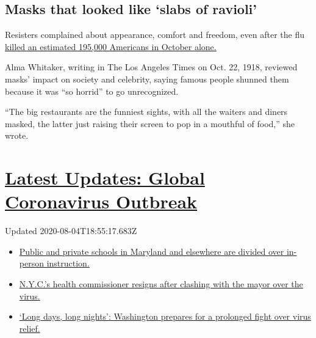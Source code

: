 \hypertarget{masks-that-looked-like-slabs-of-ravioli}{%
\subsection{Masks that looked like `slabs of
ravioli'}\label{masks-that-looked-like-slabs-of-ravioli}}

Resisters complained about appearance, comfort and freedom, even after
the flu
\href{https://www.cdc.gov/flu/pandemic-resources/1918-commemoration/pandemic-timeline-1918.htm}{killed
an estimated 195,000 Americans in October alone.}

Alma Whitaker, writing in The Los Angeles Times on Oct. 22, 1918,
reviewed masks' impact on society and celebrity, saying famous people
shunned them because it was ``so horrid'' to go unrecognized.

``The big restaurants are the funniest sights, with all the waiters and
diners masked, the latter just raising their screen to pop in a mouthful
of food,'' she wrote.

\hypertarget{latest-updates-global-coronavirus-outbreak}{%
\section{\texorpdfstring{\href{https://www.nytimes3xbfgragh.onion/2020/08/04/world/coronavirus-cases.html?action=click\&pgtype=Article\&state=default\&region=MAIN_CONTENT_1\&context=storylines_live_updates}{Latest
Updates: Global Coronavirus
Outbreak}}{Latest Updates: Global Coronavirus Outbreak}}\label{latest-updates-global-coronavirus-outbreak}}

Updated 2020-08-04T18:55:17.683Z

\begin{itemize}
\tightlist
\item
  \href{https://www.nytimes3xbfgragh.onion/2020/08/04/world/coronavirus-cases.html?action=click\&pgtype=Article\&state=default\&region=MAIN_CONTENT_1\&context=storylines_live_updates\#link-4825b93}{Public
  and private schools in Maryland and elsewhere are divided over
  in-person instruction.}
\item
  \href{https://www.nytimes3xbfgragh.onion/2020/08/04/world/coronavirus-cases.html?action=click\&pgtype=Article\&state=default\&region=MAIN_CONTENT_1\&context=storylines_live_updates\#link-4d1eafa8}{N.Y.C.'s
  health commissioner resigns after clashing with the mayor over the
  virus.}
\item
  \href{https://www.nytimes3xbfgragh.onion/2020/08/04/world/coronavirus-cases.html?action=click\&pgtype=Article\&state=default\&region=MAIN_CONTENT_1\&context=storylines_live_updates\#link-6b644638}{`Long
  days, long nights': Washington prepares for a prolonged fight over
  virus relief.}
\end{itemize}

